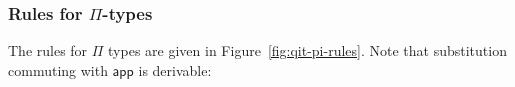 \documentclass[10pt]{article}
\theoremstyle{definition}
\newcommand\dsd[1]{\ensuremath{\mathsf{#1}}}
\newcommand{\app}[2]{\ensuremath{#1 \: #2}}
\newcommand{\fst}[1]{\app{\dsd{fst}}{#1}}
\newcommand{\snd}[1]{\app{\dsd{snd}}{#1}}
\newcommand\StI[2]{\ensuremath{\mathsf{st}_{#1}(#2)}}
\newcommand\StE[4]{\ensuremath{\mathsf{let} \, \StI{#1}{#3} \, = \, {#2} \, \mathsf{in} \, #4}}
\newcommand\FEs[4]{\ensuremath{\mathsf{let} \, \mathsf{F}_{#1}(#3) \, = \, {#2} \, \mathsf{in} \, #4}}
\newcommand\ApEl[2]{\mathcal{T}_{#1}\langle#2\rangle}
\begin{document}
\begin{enumerate}[style = multiline, labelwidth = 80pt]
\end{enumerate}


\subsubsection{Rules for $\Pi$-types}
\newcommand\qapp[1]{\ensuremath{\mathsf{app}_{#1}}}
\newcommand\qlam{\ensuremath{\mathsf{lam}}}

The rules for $\Pi$ types are given in Figure~\ref{fig:qit-pi-rules}. Note that  substitution commuting with $\mathsf{app}$ is derivable: 
\end{document}
